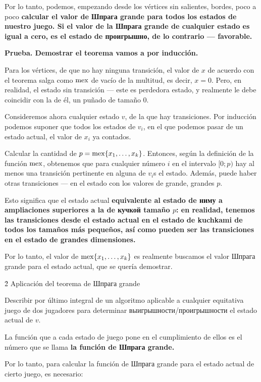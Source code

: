 Por lo tanto, podemos, empezando desde los vértices sin salientes, bordes, poco a poco \bf{calcular el valor de Шпрага grande para todos los estados de nuestro juego}. Si el valor de la Шпрага grande de cualquier estado es igual a cero, es el estado de проигрышно, de lo contrario --- favorable.

\bf{Prueba}. Demostrar el teorema vamos a por inducción.

Para los vértices, de que no hay ninguna transición, el valor de $x$ de acuerdo con el teorema salga como $\rm mex$ de vacío de la multitud, es decir, $x = 0$. Pero, en realidad, el estado sin transición --- este es perdedora estado, y realmente le debe coincidir con la de él, un puñado de tamaño $0$.

Consideremos ahora cualquier estado $v$, de la que hay transiciones. Por inducción podemos suponer que todos los estados de $v_i$, en el que podemos pasar de un estado actual, el valor de $x_i$ ya contados.

Calcular la cantidad de $p = {\rm mex} \{ x_1, \ldots, x_k \}$. Entonces, según la definición de la función $\rm mex$, obtenemos que para cualquier número $i$ en el intervalo $[0; p)$ hay al menos una transición pertinente en alguna de $v_i$s el estado. Además, puede haber otras transiciones --- en el estado con los valores de grande, grandes $p$.

Esto significa que el estado actual \bf{equivalente al estado de ниму a ampliaciones superiores a la de кучкой tamaño $p$}: en realidad, tenemos las transiciones desde el estado actual en el estado de kuchkami de todos los tamaños más pequeños, así como pueden ser las transiciones en el estado de grandes dimensiones.

Por lo tanto, el valor de ${\rm mex} \{ x_1, \ldots, x_k \}$ es realmente buscamos el valor Шпрага grande para el estado actual, que se quería demostrar.


\h2{ Aplicación del teorema de Шпрага grande }

Describir por último integral de un algoritmo aplicable a cualquier equitativa juego de dos jugadores para determinar выигрышности/проигрышности el estado actual de $v$.

La función que a cada estado de juego pone en el cumplimiento de ellos es el número que se llama \bf{la función de Шпрага grande}.

Por lo tanto, para calcular la función de Шпрага grande para el estado actual de cierto juego, es necesario:

